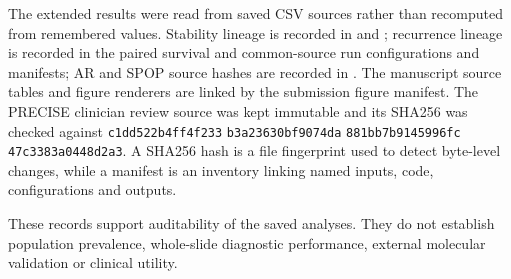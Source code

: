 The extended results were read from saved CSV sources rather than recomputed from remembered
values. Stability lineage is recorded in  and
; recurrence lineage is recorded in the paired
survival and common-source run configurations and manifests; AR and SPOP source hashes are
recorded in . The manuscript source tables
and figure renderers are linked by the submission figure manifest. The PRECISE clinician
review source was kept immutable and its SHA256 was checked against
\texttt{c1dd522b}\allowbreak\texttt{4ff4f233}\allowbreak
\texttt{b3a23630}\allowbreak\texttt{bf9074da}\allowbreak
\texttt{881bb7b9}\allowbreak\texttt{145996fc}\allowbreak
\texttt{47c3383a}\allowbreak\texttt{0448d2a3}.
A SHA256 hash is a file fingerprint used to detect byte-level changes, while a manifest is
an inventory linking named inputs, code, configurations and outputs.

These records support auditability of the saved analyses. They do not establish population
prevalence, whole-slide diagnostic performance, external molecular validation or clinical
utility.
